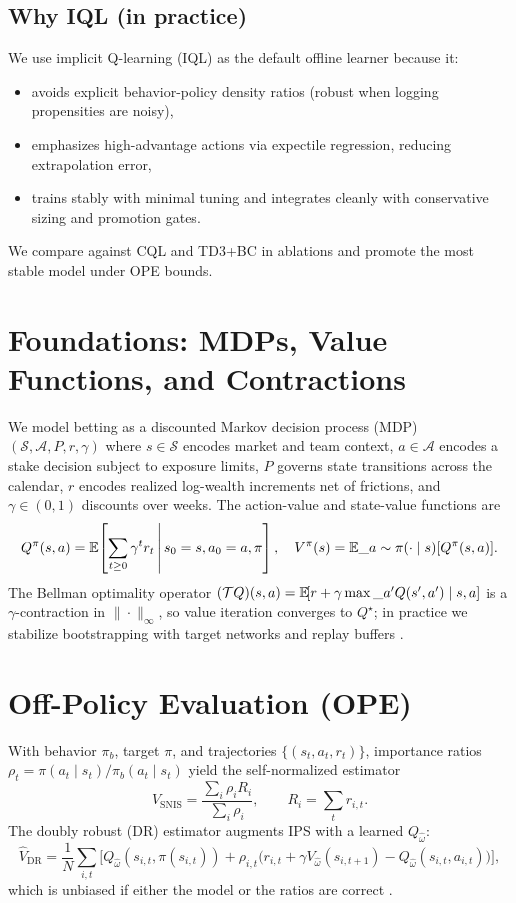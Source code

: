 \subsection*{Why IQL (in practice)}
We use implicit Q-learning (IQL) as the default offline learner because it:
\begin{itemize}
  \item avoids explicit behavior-policy density ratios (robust when logging propensities are noisy),
  \item emphasizes high-advantage actions via expectile regression, reducing extrapolation error,
  \item trains stably with minimal tuning and integrates cleanly with conservative sizing and promotion gates.
\end{itemize}
We compare against CQL and TD3+BC in ablations and promote the most stable model under OPE bounds.

\section{Foundations: MDPs, Value Functions, and Contractions}\label{sec:bellman-math}
We model betting as a discounted Markov decision process (MDP) $(\mathcal S,\mathcal A, P, r, \gamma)$ where $s\in\mathcal S$ encodes market and team context, $a\in\mathcal A$ encodes a stake decision subject to exposure limits, $P$ governs state transitions across the calendar, $r$ encodes realized log-wealth increments net of frictions, and $\gamma\in(0,1)$ discounts over weeks.
The action-value and state-value functions are
\[
Q^\pi(s,a)=\mathbb{E}\!\left[\sum_{t\ge0}\gamma^t r_{t}\,\middle|\,s_0=s, a_0=a,\pi\right],\quad V^\pi(s)=\mathbb{E}\_{a\sim\pi(\cdot\mid s)}[Q^\pi(s,a)].
\]
The Bellman optimality operator $(\mathcal{T}Q)(s,a)=\mathbb{E}\![r+\gamma\max\_{a'}Q(s',a')\mid s,a]$ is a $\gamma$-contraction in $\|\cdot\|_\infty$, so value iteration converges to $Q^\star$; in practice we stabilize bootstrapping with target networks and replay buffers \citep{sutton2018,mnih2015,vanhasselt2016}.

\section{Off-Policy Evaluation (OPE)}\label{sec:ope}
With behavior $\pi_b$, target $\pi$, and trajectories $\{(s_t,a_t,r_t)\}$, importance ratios
$\rho_t=\pi(a_t\mid s_t)/\pi_b(a_t\mid s_t)$ yield the self-normalized estimator
\[
\hat V_{\text{SNIS}}=\frac{\sum_i \rho_i R_i}{\sum_i \rho_i},\qquad R_i=\sum_t r_{i,t}.
\]
The doubly robust (DR) estimator augments IPS with a learned $Q_{\hat\omega}$:
\[
\hat V_{\text{DR}}=\frac{1}{N}\sum_{i,t}\Big[ Q_{\hat\omega}(s_{i,t},\pi(s_{i,t}))
+ \rho_{i,t}\big(r_{i,t}+\gamma V_{\hat\omega}(s_{i,t+1})-Q_{\hat\omega}(s_{i,t},a_{i,t})\big)\Big],
\]
which is unbiased if either the model or the ratios are correct \citep{dudik2014,jiang2016,thomas2015}.

